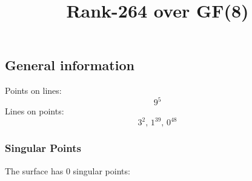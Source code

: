 \documentclass{article}
\newcommand\setTBstruts{\def\T{\rule{0pt}{2.6ex}}%
\def\B{\rule[-1.2ex]{0pt}{0pt}}}
\begin{document}
 
\setTBstruts



{\allowdisplaybreaks%






\title{Rank-264 over GF(8)}
\author{}%
\maketitle%
%
{}



\subsection*{General information}
Points on lines:
$$
9^5$$
Lines on points:
$$
3^2,\,1^{39},\,0^{48}$$
\subsubsection*{Singular Points}
The surface has 0 singular points:\\
\begin{align*}
\end{align*}
}
\end{document}
